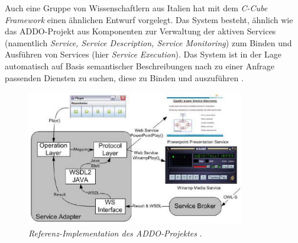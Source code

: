 Auch eine Gruppe von Wissenschaftlern aus Italien hat mit dem \emph{C-Cube Framework}\cite{ccube} einen ähnlichen Entwurf vorgelegt. Das System besteht, ähnlich wie das \ac{ADDO}-Projekt aus Komponenten zur Verwaltung der aktiven Services (namentlich \emph{Service, Service Description, Service Monitoring}) zum Binden und Ausführen von Services (hier \emph{Service Execution}). Das System ist in der Lage automatisch auf Basis semantischer Beschreibungen nach zu einer Anfrage passenden Diensten zu suchen, diese zu Binden und auszuführen \cite[S.4]{ccube}.

\begin{figure}[ht]
\centering
\parbox{0.85\textwidth}{
    \includegraphics[width=0.85\textwidth]{media/addo-player-example.png}
    \caption{\emph{Referenz-Implementation des \ac{ADDO}-Projektes} \cite[S.418]{flexbrok}.}
    \label{f:addo-player}
}
\end{figure}

